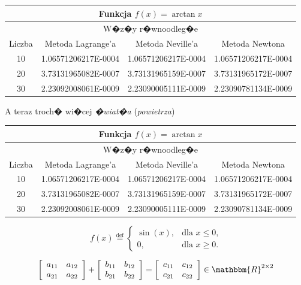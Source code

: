 \documentclass[11pt,wide]{mwart}
\begin{document}
\begin{center}
\begin{tabular}{||c||c|c|c||} \hline
\multicolumn{4}{||c||}{Funkcja $f(x)=\arctan x$} \\ \hline
\multicolumn{4}{||c||}{W�z�y r�wnoodleg�e} \\ \hline
Liczba & Metoda Lagrange'a & Metoda Neville'a & Metoda Newtona \\ \hline
10 &  1.06571206217E-0004 &  1.06571206217E-0004 &  1.06571206217E-0004 \\
\hline
20 &  3.73131965082E-0007 &  3.73131965159E-0007 &  3.73131965172E-0007 \\
\hline
30 &  2.23092008061E-0009 &  2.23090005111E-0009 &  2.23090781134E-0009 \\
\hline
\end{tabular}
\end{center}

A teraz troch� wi�cej \textit{�wiat�a} (\textsl{powietrza})
\renewcommand{\arraystretch}{1.5}  %
\begin{center}
\begin{tabular}{||c||c|c|c||} \hline
\multicolumn{4}{||c||}{Funkcja $f(x)=\arctan x$} \\ \hline
\multicolumn{4}{||c||}{W�z�y r�wnoodleg�e} \\ \hline
Liczba & Metoda Lagrange'a & Metoda Neville'a & Metoda Newtona \\ \hline
10 &  1.06571206217E-0004 &  1.06571206217E-0004 &  1.06571206217E-0004 \\
\hline
20 &  3.73131965082E-0007 &  3.73131965159E-0007 &  3.73131965172E-0007 \\
\hline
30 &  2.23092008061E-0009 &  2.23090005111E-0009 &  2.23090781134E-0009 \\
\hline
\end{tabular}
\end{center}
\renewcommand{\arraystretch}{1}  %


\begin{equation}
f(x)
\stackrel{\text{def}}{=}
\begin{cases}
  \sin(x), & \text{dla $x\leq 0$,}\\
  0,       & \text{dla $x\geq 0$.}
\end{cases}
\end{equation}

\begin{equation}
\left[
\begin{array}{cc}
a_{11} & a_{12}\\
a_{21} & a_{22}
\end{array}
\right]
+
\left[
\begin{array}{cc}
b_{11} & b_{12}\\
b_{21} & b_{22}
\end{array}
\right]
=
\left[
\begin{array}{cc}
c_{11} & c_{12}\\
c_{21} & c_{22}
\end{array}
\right]\in\mathbbm{R}^{2\times2}
\end{equation}
\end{document}
